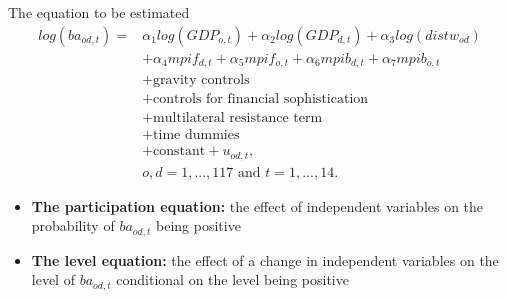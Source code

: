 \documentclass{beamer}
\begin{document}

\begin{frame}{The equation to be estimated}
\begin{align}
log(ba_{od,t})= & \alpha_1 log(GDP_{o,t})+\alpha_2 log(GDP_{d,t}) +\alpha_3 log(distw_{od}) \nonumber\\
& + \alpha_4 mpif_{d,t} + \alpha_5 mpif_{o,t} + \alpha_6 mpib_{d,t} + \alpha_7 mpib_{o,t} \nonumber\\
& + \text{gravity controls} \nonumber\\
& + \text{controls for financial sophistication} \nonumber\\
& + \text{multilateral resistance term} \nonumber\\
& + \text{time dummies} \nonumber\\
& + \text{constant}+ u_{od,t},  \\
& o, d=1, ..., 117 \text{ and } t=1, ..., 14. \nonumber
\label{my participation}
\end{align}
\begin{itemize}
\item \textbf{The participation equation:} the effect of independent variables on the probability of $ba_{od,t}$ being positive
\item \textbf{The level equation:} the effect of a change in independent variables on the level of $ba_{od,t}$ conditional on the level being positive
\end{itemize}
\end{frame}
\end{document}
